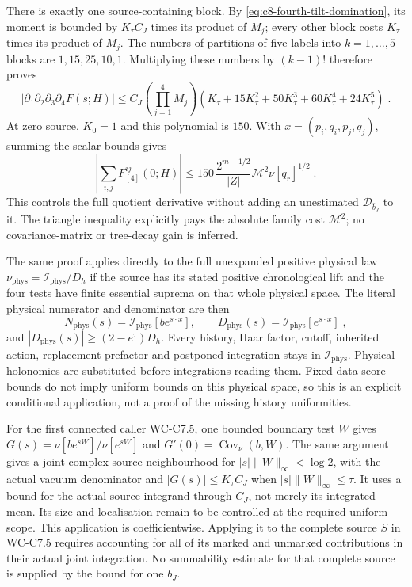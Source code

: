 \documentclass[11pt]{article}
\begin{document}
There is exactly one source-containing block. By
\eqref{eq:c8-fourth-tilt-domination}, its moment is bounded by
$K_\tau C_J$ times its product of $M_j$; every other block costs
$K_\tau$ times its product of $M_j$. The numbers of partitions of
five labels into $k=1,\ldots,5$ blocks are $1,15,25,10,1$.
Multiplying these numbers by $(k-1)!$ therefore proves
\begin{equation}\label{eq:c8-fourth-complex-response-bound}
    |\partial_1\partial_2\partial_3\partial_4F(s;H)|
        \leq C_J\left(\prod_{j=1}^{4}M_j\right)
            \left(K_\tau+15K_\tau^2+50K_\tau^3
                +60K_\tau^4+24K_\tau^5\right)\;.
\end{equation}
At zero source, $K_0=1$ and this polynomial is $150$. With
$x=(p_i,q_i,p_j,q_j)$, summing the scalar bounds gives
\begin{equation}\label{eq:c8-fourth-full-family-bound}
    \left|\sum_{i,j}F^{ij}_{[4]}(0;H)\right|
        \leq150\,\frac{2^{m-1/2}}{|Z|}\mathcal M^2
            \nu[\bar q_r]^{1/2}\;.
\end{equation}
This controls the full quotient derivative without adding an unestimated
$\mathcal D_{\bar b_J}$ to it. The triangle inequality explicitly
pays the absolute family cost $\mathcal M^2$; no covariance-matrix or
tree-decay gain is inferred.

The same proof applies directly to the full unexpanded positive physical
law $\nu_{\mathrm{phys}}=\mathcal I_{\mathrm{phys}}/D_h$ if the
source has its stated positive chronological lift and the four tests
have finite essential suprema on that whole physical space. The literal
physical numerator and denominator are then
\begin{equation}\label{eq:c8-fourth-full-physical-tilt}
    N_{\mathrm{phys}}(s)=\mathcal I_{\mathrm{phys}}[be^{s\cdot x}],\qquad
    D_{\mathrm{phys}}(s)=\mathcal I_{\mathrm{phys}}[e^{s\cdot x}]\;,
\end{equation}
and $|D_{\mathrm{phys}}(s)|\geq(2-e^\tau)D_h$.
Every history, Haar factor, cutoff, inherited action, replacement
prefactor and postponed integration stays in $\mathcal I_{\mathrm{phys}}$.
Physical holonomies are substituted before integrations reading them.
Fixed-data score bounds do not imply uniform bounds on this physical
space, so this is an explicit conditional application, not a proof of
the missing history uniformities.

For the first connected caller WC-C7.5, one bounded boundary test $W$
gives $G(s)=\nu[be^{sW}]/\nu[e^{sW}]$ and
$G'(0)=\operatorname{Cov}_\nu(b,W)$. The same argument gives a joint
complex-source neighbourhood for $|s|\|W\|_\infty<\log2$, with the
actual vacuum denominator and $|G(s)|\leq K_\tau C_J$ when
$|s|\|W\|_\infty\leq\tau$. It uses a bound for the actual source
integrand through $C_J$, not merely its integrated mean. Its size and
localisation remain to be controlled at the required uniform scope.
This application is coefficientwise. Applying it to the complete source
$S$ in WC-C7.5 requires accounting for all of its marked and unmarked
contributions in their actual joint integration. No summability estimate
for that complete source is supplied by the bound for one $b_J$.
\end{document}
